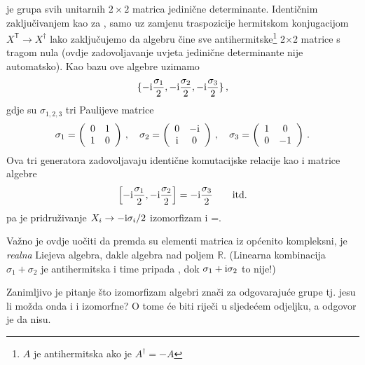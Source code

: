 \begin{primjer} \label{pr:su2so3Alg}
     je grupa svih unitarnih $2\times 2$ matrica jedinične determinante.
    Identičnim zaključivanjem kao za , samo uz zamjenu traspozicije
    hermitskom konjugacijom $X^\mathsf{T} \to X^\mathsf{\dagger}$ lako
    zaključujemo da algebru  čine sve
    antihermitske\footnote{$A$ je antihermitska ako je $A^\dagger=-A$} 
    2$\times$2 matrice s tragom nula (ovdje zadovoljavanje uvjeta jedinične
    determinante nije automatsko). Kao bazu ove algebre uzimamo
\begin{equation}
     \{ -\textrm{i}\frac{\sigma_1}{2},  -\textrm{i}\frac{\sigma_2}{2},  -\textrm{i}\frac{\sigma_3}{2} \} \,,
\end{equation}
gdje su $\sigma_{1,2,3}$ tri Paulijeve matrice
\begin{equation}
\sigma_1=\left( \begin{array}{cc} 0 &  1 \\ 1 & 0 \end{array} \right) \,,
\quad
\sigma_2=\left( \begin{array}{cc} 0 & -\textrm{i} \\ \textrm{i} & 0 \end{array} \right) \,,
\quad
\sigma_3=\left( \begin{array}{cc} 1 &  0 \\ 0 &-1 \end{array} \right) \,.
\label{eq:PaulijeveMatrice}
\end{equation}
Ova tri generatora zadovoljavaju identične komutacijske relacije kao i matrice
 algebre
\begin{displaymath}
 \left[ -\textrm{i}\frac{\sigma_1}{2}, -\textrm{i}\frac{\sigma_2}{2} \right] =
 -\textrm{i}\frac{\sigma_3}{2} \qquad \text{itd.}
\end{displaymath}
pa je pridruživanje $X_i \to -\textrm{i} \sigma_i/2$  izomorfizam i
=.

Važno je ovdje uočiti da premda su elementi matrica iz  općenito kompleksni,
 je \emph{realna} Liejeva algebra, dakle algebra nad poljem $\mathbb{R}$. 
(Linearna kombinacija $\sigma_1 + \sigma_2$ je antihermitska i time pripada ,
dok $\sigma_1 + \textrm{i} \sigma_2$ to nije!)

Zanimljivo je pitanje što izomorfizam algebri znači za odgovarajuće grupe tj.
jesu li možda onda i  i  izomorfne? O tome će biti riječi u sljedećem odjeljku,
a odgovor je da nisu.
\end{primjer}

